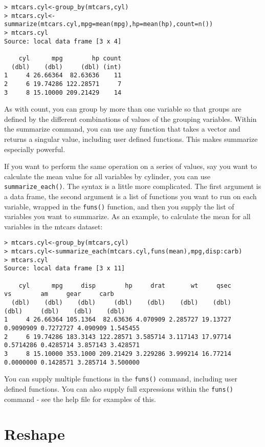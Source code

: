 \documentclass[12pt, oneside]{amsart}   	%
\begin{document}
\begin{verbatim}
> mtcars.cyl<-group_by(mtcars,cyl)
> mtcars.cyl<-summarize(mtcars.cyl,mpg=mean(mpg),hp=mean(hp),count=n())
> mtcars.cyl
Source: local data frame [3 x 4]

    cyl      mpg        hp count
  (dbl)    (dbl)     (dbl) (int)
1     4 26.66364  82.63636    11
2     6 19.74286 122.28571     7
3     8 15.10000 209.21429    14
\end{verbatim}

As with count, you can group by more than one variable so that groups are defined by the different combinations of values of the grouping variables. Within the summarize command, you can use any function that takes a vector and returns a singular value, including user defined functions. This makes summarize especially powerful. 

If you want to perform the same operation on a series of values, say you want to calculate the mean value for all variables by cylinder, you can use \texttt{summarize\_each()}. The syntax is a little more complicated. The first argument is a data frame, the second argument is a list of functions you want to run on each variable, wrapped in the \texttt{funs()} function, and then you supply the list of variables you want to summarize. As an example, to calculate the mean for all variables in the mtcars dataset:

\begin{verbatim}
> mtcars.cyl<-group_by(mtcars,cyl)
> mtcars.cyl<-summarize_each(mtcars.cyl,funs(mean),mpg,disp:carb)
> mtcars.cyl
Source: local data frame [3 x 11]

    cyl      mpg     disp        hp     drat       wt     qsec        vs        am     gear     carb
  (dbl)    (dbl)    (dbl)     (dbl)    (dbl)    (dbl)    (dbl)     (dbl)     (dbl)    (dbl)    (dbl)
1     4 26.66364 105.1364  82.63636 4.070909 2.285727 19.13727 0.9090909 0.7272727 4.090909 1.545455
2     6 19.74286 183.3143 122.28571 3.585714 3.117143 17.97714 0.5714286 0.4285714 3.857143 3.428571
3     8 15.10000 353.1000 209.21429 3.229286 3.999214 16.77214 0.0000000 0.1428571 3.285714 3.500000
\end{verbatim} 

You can supply multiple functions in the \texttt{funs()} command, including user defined functions. You can also supply full expressions within the \texttt{funs()} command - see the help file for examples of this.

\section{Reshape}
\end{document}
